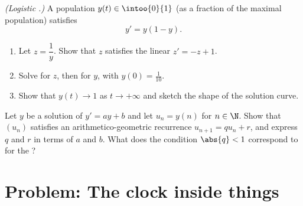 \begin{exercise}[$\star\star\star$]\label{exo:g12:diffeq:8}
\emph{(Logistic .)} A population $y(t) \in \intoo{0}{1}$ (as a
fraction of the maximal population) satisfies
\[
y' = y(1 - y).
\]
\begin{enumerate}
  \item Let $z = \dfrac{1}{y}$. Show that $z$ satisfies the linear 
        $z' = -z + 1$.
  \item Solve for $z$, then for $y$, with $y(0) = \frac{1}{10}$.
  \item Show that $y(t) \to 1$ as $t \to +\infty$ and sketch the shape of
        the solution curve.
\end{enumerate}
\end{exercise}

\begin{exercise}[$\star\star\star$]\label{exo:g12:diffeq:9}
Let $y$ be a solution of $y' = ay + b$ and let $u_n = y(n)$ for $n \in \N$.
Show that $(u_n)$ satisfies an arithmetico-geometric recurrence
$u_{n+1} = q u_n + r$, and express $q$ and $r$ in terms of $a$ and $b$. What
does the condition $\abs{q} < 1$ correspond to for the ?
\end{exercise}

\section{Problem: The clock inside things}

